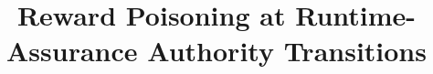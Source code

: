 \documentclass[conference]{IEEEtran}
\begin{document}
%
\title{Reward Poisoning at Runtime-Assurance Authority Transitions}


\author{}


% 
\end{document}
